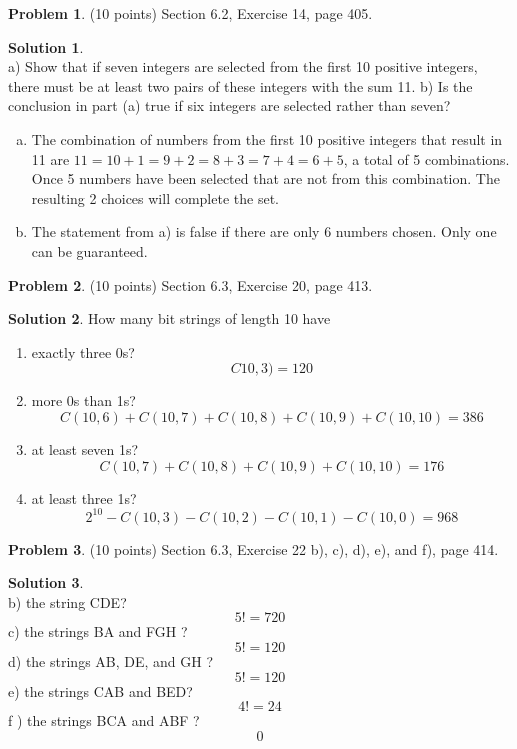 \documentclass{article}
\theoremstyle{definition}
\newtheorem{problem}{Problem}
\newtheorem*{solution}{Solution}
\begin{document}
\begin{problem} (10 points) 
Section 6.2, Exercise 14, page 405.
\end{problem}
\begin{solution}\ \\
a) Show that if seven integers are selected from the first
10 positive integers, there must be at least two pairs
of these integers with the sum 11.
b) Is the conclusion in part (a) true if six integers are
selected rather than seven?
\begin{enumerate}[a)]
  \item The combination of numbers from the first 10 positive integers that result in 11 are $11 = 10+1=9+2=8+3=7+4=6+5$, a total of 5 combinations. Once 5 numbers have been selected that are not from this combination. The resulting 2 choices will complete the set.
  \item The statement from a) is false if there are only 6 numbers chosen. Only one can be guaranteed.
\end{enumerate}
\end{solution}

\begin{problem} (10 points) 
Section 6.3, Exercise 20, page 413.
\end{problem}
\begin{solution} 
How many bit strings of length 10 have
\begin{enumerate}
  \item exactly three 0s?
  $$C10,3) = 120$$
  \item more 0s than 1s?
  $$C(10,6) + C(10,7) + C(10,8) + C(10,9) + C(10,10) = 386$$
  \item at least seven 1s?
  $$C(10,7) + C(10,8) + C(10,9) + C(10,10) = 176$$
  \item at least three 1s?
  $$2^{10} - C(10,3) - C(10,2) - C(10,1) - C(10,0) = 968$$
\end{enumerate}
\end{solution}

\begin{problem} (10 points) 
Section 6.3, Exercise 22 b), c), d), e), and f), page 414.
\end{problem}
\begin{solution}\ \\
b) the string CDE?
$$5! = 720$$
c) the strings BA and FGH ?
$$5! = 120$$
d) the strings AB, DE, and GH ?
$$5! = 120$$
e) the strings CAB and BED?
$$4! = 24$$
f ) the strings BCA and ABF ? 
$$0$$
\end{solution}
\end{document}
